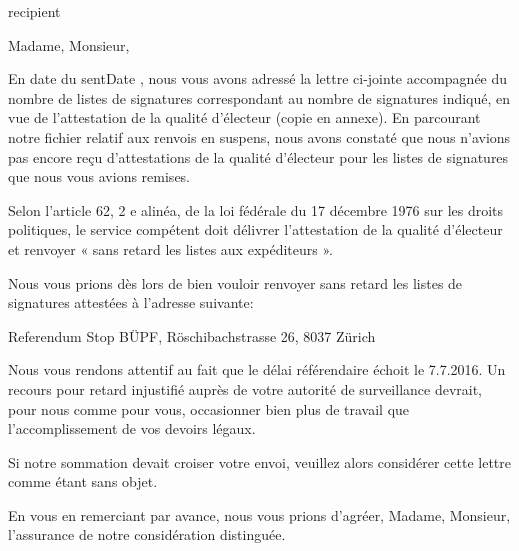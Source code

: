 \documentclass[a4paper,10pt,parskip=half,french]{scrlttr2}
\begin{document}
\begin{letter}{{{ recipient }}}





\opening{Madame, Monsieur,}

En date du {{ sentDate }}, nous vous avons adressé la lettre ci-jointe accompagnée du nombre de listes de signatures correspondant au nombre de signatures indiqué, en vue de l’attestation de la qualité d’électeur (copie en annexe). En parcourant notre fichier relatif aux renvois en suspens, nous avons constaté que nous n’avions pas encore reçu d’attestations de la qualité d’électeur pour les listes de signatures que nous vous avions remises. 

Selon l’article 62, 2 e alinéa, de la loi fédérale du 17 décembre 1976 sur les droits politiques, le service compétent doit délivrer l’attestation de la qualité d’électeur et renvoyer « sans retard les listes aux expéditeurs ». 

Nous vous prions dès lors de bien vouloir renvoyer sans retard les listes de signatures attestées à l’adresse suivante:

\leftskip=3mm
Referendum Stop BÜPF, Röschibachstrasse 26, 8037 Zürich

\leftskip=0mm
Nous vous rendons attentif au fait que le délai référendaire échoit le 7.7.2016. Un recours pour retard injustifié auprès de votre autorité de surveillance devrait, pour nous comme pour vous, occasionner bien plus de travail que l’accomplissement de vos devoirs légaux.

Si notre sommation devait croiser votre envoi, veuillez alors considérer cette lettre comme étant sans objet.

\leftskip=0mm
\closing{En vous en remerciant par avance, nous vous prions d’agréer, Madame, Monsieur, l’assurance de notre considération distinguée.}

\end{letter}
\end{document}
